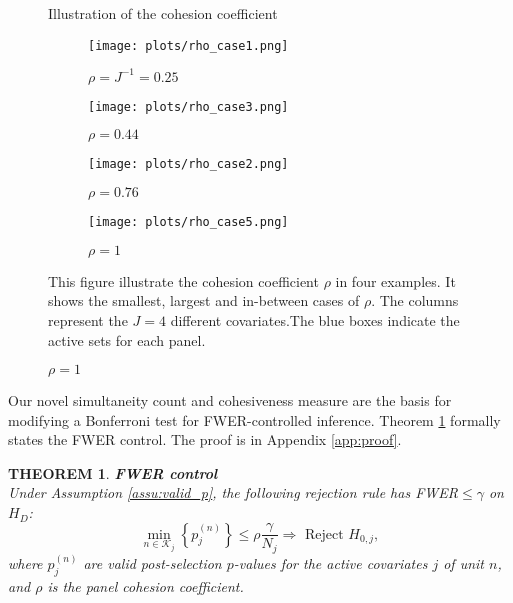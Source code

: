 \documentclass[11pt]{article}
\newtheorem{theorem}{THEOREM}
\newcommand\tcaptab[1]{\captionsetup{position=top, font=normalsize, labelfont=bf, textfont=normalfont, justification=centering, margin=0mm, aboveskip=1mm, belowskip=0mm, labelsep=colon, singlelinecheck=false}\caption{#1}}
\newcommand\bnotetab[1]{\captionsetup{position=bottom, font=footnotesize,  textfont=normalfont, margin=1mm, skip=2mm, justification=justified, singlelinecheck=false}\caption*{#1}}
\begin{document}
\begin{figure}[t!]
	\tcaptab{Illustration of the cohesion coefficient}\label{fig:cohe}
	\begin{center}
		\begin{subfigure}[t]{.24\textwidth}
			\texttt{[image: plots/rho\_case1.png]}
			\caption{$\rho=J^{-1}=0.25$}
		\end{subfigure}
		\begin{subfigure}[t]{.24\textwidth}
			\texttt{[image: plots/rho\_case3.png]}
			\caption{$\rho=0.44$}
		\end{subfigure}
		\begin{subfigure}[t]{.24\textwidth}
			\texttt{[image: plots/rho\_case2.png]}
			\caption{$\rho=0.76$}
		\end{subfigure}
			\begin{subfigure}[t]{.24\textwidth}
				\texttt{[image: plots/rho\_case5.png]}
				\caption{$\rho=1$}
			\end{subfigure}
		\end{center}
		\bnotetab{This figure illustrate the cohesion coefficient $\rho$ in four examples. It shows the smallest, largest and in-between cases of $\rho$. The columns represent the $J=4$ different covariates.The blue boxes indicate the active sets for each panel.}   
	\end{figure}
	
	
	
	Our novel simultaneity count and cohesiveness measure are the basis for modifying a Bonferroni test for FWER-controlled inference. Theorem \ref{thm_MT} formally states the FWER control. The proof is in Appendix \ref{app:proof}. 
	
	\begin{theorem}{\bf FWER control}\label{thm_MT}\\
		Under Assumption \ref{assu:valid_p}, 
		the following rejection rule has FWER$\leq \gamma$ on $H_D$:  
		\begin{equation}
			\min_{n\in \mathcal{K}_j} \left \{p^{(n)}_j \right\}\leq \rho\frac{\gamma}{ N_j}\Rightarrow\text{ Reject $H_{0,j}$},
		\end{equation}
		where $p^{(n)}_j$ are valid post-selection $p$-values for the active covariates $j$ of unit $n$, and $\rho $ is the panel cohesion coefficient.
	\end{theorem}
	
\end{document}
